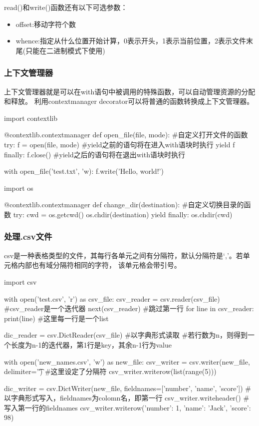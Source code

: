       read()和write()函数还有以下可选参数：
      \begin{itemize}
        \item offset:移动字符个数
        \item whence:指定从什么位置开始计算，0表示开头，1表示当前位置，2表示文件末尾(只能在二进制模式下使用)
      \end{itemize}

    \subsubsection{上下文管理器}
      上下文管理器就是可以在with语句中被调用的特殊函数，可以自动管理资源的分配和释放。
      利用contextmanager decorator可以将普通的函数转换成上下文管理器。
      \begin{codeblock}[language=python, caption={contextmanager}]
        import contextlib

        @contextlib.contextmanager
        def open_file(file, mode): #自定义打开文件的函数
            try:
                f = open(file, mode) #yield之前的语句将在进入with语块时执行
                yield f
            finally:
                f.close() #yield之后的语句将在退出with语块时执行

        with open_file('test.txt', 'w):
            f.write('Hello, world!')

        import os

        @contextlib.contextmanager
        def change_dir(destination): #自定义切换目录的函数
        try:
            cwd = os.getcwd()
            os.chdir(destination)
            yield
        finally:
            os.chdir(cwd)
      \end{codeblock}

    \subsubsection{处理.csv文件}
      csv是一种表格类型的文件，其每行各单元之间有分隔符，默认分隔符是`,'。若单元格内部也有域分隔符相同的字符，
      该单元格会带引号。
      \begin{codeblock}[language=python, caption={read and write .csv files}]
        import csv

        with open('test.csv', 'r') as csv_file:
            csv_reader = csv.reader(csv_file) #csv\_reader是一个迭代器
            next(csv_reader) #跳过第一行
            for line in csv_reader:
                print(line) #这里每一行是一个list

          dic_reader = csv.DictReader(csv_file) #以字典形式读取
          #若行数为n，则得到一个长度为n-1的迭代器，第1行是key，其余n-1行为value

        with open('new_names.csv', 'w') as new_file:
            csv_writer = csv.writer(new_file, delimiter='\t') #这里设定了分隔符
            csv_writer.writerow(list(range(5)))

            dic_writer = csv.DictWriter(new_file, fieldnames=['number', 'name', 'score'])
            #以字典形式写入，fieldnames为colomn名，即第一行
            csv_writer.writeheader() #写入第一行的fieldnames
            csv_writer.writerow({'number': 1, 'name': 'Jack', 'score': 98})
      \end{codeblock}

